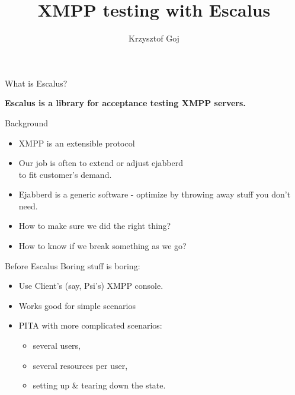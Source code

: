 \documentclass[17pt]{beamer}
\title{XMPP testing with Escalus}
\author{Krzysztof Goj}
\begin{document}
\begin{frame}
\titlepage
\end{frame}

\begin{frame}{What is Escalus?}
\begin{center}
\textbf{Escalus is \alert<1>{a library} \alert<2>{for acceptance testing} \alert<3>{XMPP servers}.}

\vspace{1em}

\begin{footnotesize}
\end{footnotesize}
\end{center}
\end{frame}

\begin{frame}{Background}
\begin{small}
\begin{itemize}
\item XMPP is an extensible protocol
\item Our job is often to extend or adjust ejabberd\\ to fit customer's demand.
\item Ejabberd is a generic software - optimize by throwing away stuff you don't need.
\item How to make sure we did the right thing?
\item How to know if we break something as we go?
\end{itemize}
\end{small}
\end{frame}

\begin{frame}{Before Escalus}
Boring stuff is boring:
\begin{itemize}
\item Use Client's (say, Psi's) XMPP console.
\item Works good for simple scenarios
\item PITA with more complicated scenarios:
    \begin{itemize}
    \item several users,
    \item several resources per user,
    \item setting up \& tearing down the state.
    \end{itemize}
\end{itemize}
\end{frame}
\end{document}
